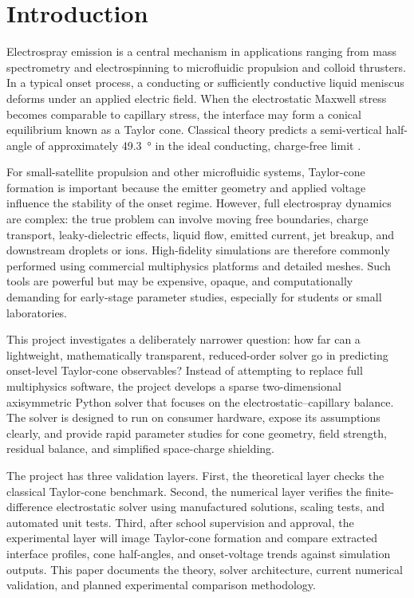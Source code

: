 \section{Introduction}

Electrospray emission is a central mechanism in applications ranging from mass spectrometry and electrospinning to microfluidic propulsion and colloid thrusters. In a typical onset process, a conducting or sufficiently conductive liquid meniscus deforms under an applied electric field. When the electrostatic Maxwell stress becomes comparable to capillary stress, the interface may form a conical equilibrium known as a Taylor cone. Classical theory predicts a semi-vertical half-angle of approximately \SI{49.3}{\degree} in the ideal conducting, charge-free limit \cite{taylor1964disintegration}.

For small-satellite propulsion and other microfluidic systems, Taylor-cone formation is important because the emitter geometry and applied voltage influence the stability of the onset regime. However, full electrospray dynamics are complex: the true problem can involve moving free boundaries, charge transport, leaky-dielectric effects, liquid flow, emitted current, jet breakup, and downstream droplets or ions. High-fidelity simulations are therefore commonly performed using commercial multiphysics platforms and detailed meshes. Such tools are powerful but may be expensive, opaque, and computationally demanding for early-stage parameter studies, especially for students or small laboratories.

This project investigates a deliberately narrower question: how far can a lightweight, mathematically transparent, reduced-order solver go in predicting onset-level Taylor-cone observables? Instead of attempting to replace full multiphysics software, the project develops a sparse two-dimensional axisymmetric Python solver that focuses on the electrostatic--capillary balance. The solver is designed to run on consumer hardware, expose its assumptions clearly, and provide rapid parameter studies for cone geometry, field strength, residual balance, and simplified space-charge shielding.

The project has three validation layers. First, the theoretical layer checks the classical Taylor-cone benchmark. Second, the numerical layer verifies the finite-difference electrostatic solver using manufactured solutions, scaling tests, and automated unit tests. Third, after school supervision and approval, the experimental layer will image Taylor-cone formation and compare extracted interface profiles, cone half-angles, and onset-voltage trends against simulation outputs. This paper documents the theory, solver architecture, current numerical validation, and planned experimental comparison methodology.
